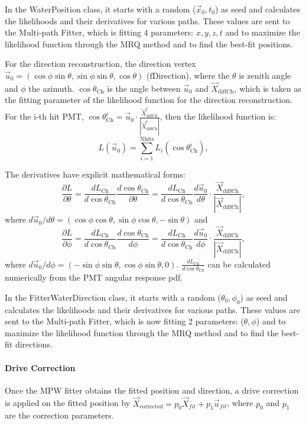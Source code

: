 In the WaterPosition class, it starts with a random ($\vec{x}_0,t_0$) as seed and calculates the likelihoods and their derivatives for various paths. These values are sent to the Multi-path Fitter, which is fitting 4 parameters: $x,y,z,t$ and to maximize the likelihood function through the MRQ method and to find the best-fit positions.

For the direction reconstruction, the direction vertex $\vec{u}_{0}=(\cos\phi\sin\theta,\sin\phi\sin\theta,\cos\theta)$ ($\mathrm{fDirection}$), where the $\theta$ is zenith angle and $\phi$ the azimuth. $\cos\theta_{\mathrm{Ch}}$ is the angle between $\vec{u}_{0}$ and $\vec{X}_{{\mathrm{diffCh}}}$, which is taken as the fitting parameter of the likelihood function for the direction reconstruction. For the i-th hit PMT, $\cos\theta^i_{\mathrm{Ch}}=\vec{u}_0\cdot\frac{\vec{X}^i_{{\mathrm{diffCh}}}}{|\vec{X}^i_{{\mathrm{diffCh}}}|}$, then the likelihood function is:
\[
L(\vec{u}_0)=\sum_{i=1}^{{\mathrm{Nhits}}}L_i(\cos\theta_{\mathrm{Ch}}^i),
\]

The derivatives have explicit mathematical forms:
\[
\frac{\partial L}{\partial\theta}=\frac{dL_{\mathrm{Ch}}}{d\cos\theta_{\mathrm{Ch}}}\frac{d\cos\theta_{\mathrm{Ch}}}{\partial\theta}
=\frac{dL_{\mathrm{Ch}}}{d\cos\theta_{\mathrm{Ch}}}\frac{d\vec{u}_0}{d\theta}\cdot\frac{\vec{X}_{{\mathrm{diffCh}}}}{|\vec{X}_{{\mathrm{diffCh}}}|},
\]
where $d\vec{u}_0/d\theta=(\cos\phi\cos\theta, \sin\phi\cos\theta, -\sin\theta)$ and 
\[
\frac{\partial　L}{\partial\phi}=\frac{dL_{\mathrm{Ch}}}{d\cos\theta_{\mathrm{Ch}}}\frac{d\cos\theta_{\mathrm{Ch}}}{d\phi}
=\frac{dL_{\mathrm{Ch}}}{d\cos\theta_{\mathrm{Ch}}}\frac{d\vec{u}_0}{d\phi}\cdot\frac{\vec{X}_{{\mathrm{diffCh}}}}{|\vec{X}_{{\mathrm{diffCh}}}|},
\] where $d\vec{u}_0/d\phi=(-\sin\phi\sin\theta, \cos\phi\sin\theta, 0)$. $\frac{dL_{\mathrm{Ch}}}{d\cos\theta_{\mathrm{Ch}}}$ can be calculated numerically from the PMT angular response pdf.

In the FitterWaterDirection class, it starts with a random ($\theta_0,\phi_0$) as seed and calculates the likelihoods and their derivatives for various paths. These values are sent to the Multi-path Fitter, which is now fitting 2 parameters: ($\theta,\phi$) and to maximize the likelihood function through the MRQ method and to find the best-fit directions.

\paragraph{Drive Correction}
Once the MPW fitter obtains the fitted position and direction, a drive correction is applied on the fitted position by $\vec{X}_{\mathrm{corrected}} = p_0\vec{X}_{fit}+p_1\vec{u}_{fit}$, where $p_0$ and $p_1$ are the correction parameters.


